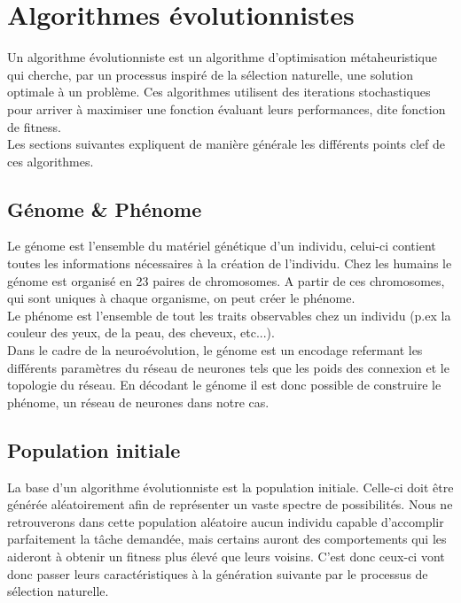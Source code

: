 \documentclass{article}
\begin{document}
\newpage
\section{Algorithmes évolutionnistes}

Un algorithme évolutionniste est un algorithme d'optimisation métaheuristique qui cherche, par un processus inspiré de la sélection naturelle, une solution optimale à un problème. Ces algorithmes utilisent des iterations stochastiques pour arriver à maximiser une fonction évaluant leurs performances, dite fonction de fitness\cite{wikiea}.\\

Les sections suivantes expliquent de manière générale les différents points clef de ces algorithmes.

\subsection{Génome \& Phénome}

Le génome est l'ensemble du matériel génétique d'un individu, celui-ci contient toutes les informations nécessaires à la création de l'individu\cite{wikigenome}. Chez les humains le génome est organisé en 23 paires de chromosomes. A partir de ces chromosomes, qui sont uniques à chaque organisme, on peut créer le phénome.\\
Le phénome est l'ensemble de tout les traits observables chez un individu (p.ex la couleur des yeux, de la peau, des cheveux, etc...)\cite{wikiphenome}.\\

Dans le cadre de la neuroévolution, le génome est un encodage refermant les différents paramètres du réseau de neurones tels que les poids des connexion et le topologie du réseau. En décodant le génome il est donc possible de construire le phénome, un réseau de neurones dans notre cas.

\subsection{Population initiale}

La base d'un algorithme évolutionniste est la population initiale. Celle-ci doit être générée aléatoirement afin de représenter un vaste spectre de possibilités. 
Nous ne retrouverons dans cette population aléatoire aucun individu capable d'accomplir parfaitement la tâche demandée, mais certains auront des comportements qui les aideront à obtenir un fitness plus élevé que leurs voisins. C'est donc ceux-ci vont donc passer leurs caractéristiques à la génération suivante par le processus de sélection naturelle.
\end{document}
